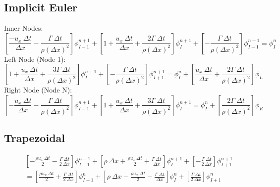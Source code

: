 \documentclass[12pt]{article}
\begin{document}
\subsection{Implicit Euler}
Inner Nodes:
\begin{equation}
    \left[ \frac{-u_x\: \Delta t}{\Delta x} - \frac{\Gamma\:\Delta t}{\rho\left(\Delta x\right)^2} \right]\phi_{I-1}^{n+1} + \left[ 1 + \frac{u_x\: \Delta t}{\Delta x} + \frac{2\Gamma\: \Delta t}{\rho\left(\Delta x\right)^2} \right]\phi_{I}^{n+1} + \left[ -\frac{\Gamma\: \Delta t}{\rho\left(\Delta x\right)^2} \right]\phi_{I+1}^{n+1} = \phi_{I}^{n}
    \label{eq:ie inner}
\end{equation}
Left Node (Node 1):
\begin{equation}
    \left[ 1 + \frac{u_x\:\Delta t}{\Delta x} + \frac{3\Gamma\:\Delta t}{\rho\left(\Delta x\right)^2} \right]\phi_{I}^{n+1} + \left[ -\frac{\Gamma\:\Delta t}{\rho\left(\Delta x\right)^2} \right]\phi_{I+1}^{n+1} = \phi_{I}^{n} + \left[ \frac{u_x\:\Delta t}{\Delta x} + \frac{2\Gamma\:\Delta t}{\rho\left(\Delta x\right)^2} \right]\phi_{L}
    \label{eq:ie left}
\end{equation}
Right Node (Node N):
\begin{equation}
    \left[ -\frac{u_x\:\Delta t}{\Delta x} - \frac{\Gamma\:\Delta t}{\rho\left(\Delta x\right)^2} \right]\phi_{I-1}^{n+1} + \left[ 1 + \frac{u_x\:\Delta t}{\Delta x} + \frac{3\Gamma\:\Delta t}{\rho\left(\Delta x\right)^2} \right]\phi_{I}^{n+1} = \phi_{I}^{n} + \left[ \frac{2\Gamma\:\Delta t}{\rho\left(\Delta x\right)^2} \right]\phi_{R}
    \label{eq:ie right}
\end{equation}


\subsection{Trapezoidal}
\begin{multline*}
    \left[ -\frac{\rho u_x\: \Delta t}{2} - \frac{\Gamma\: \Delta t}{2\: \Delta x} \right]\phi_{I-1}^{n+1} + \left[ \rho \:\Delta x + \frac{\rho u_x\: \Delta t}{2} + \frac{\Gamma\: \Delta t}{\Delta x} \right]\phi_{I}^{n+1} + \left[ -\frac{\Gamma\: \Delta t}{2\: \Delta x} \right]\phi_{I+1}^{n+1}\\
    = \left[ \frac{\rho u_x\: \Delta t}{2} + \frac{\Gamma\: \Delta t}{2\: \Delta x} \right]\phi_{I-1}^{n} + \left[ \rho \:\Delta x - \frac{\rho u_x\: \Delta t}{2} - \frac{\Gamma\: \Delta t}{\Delta x} \right]\phi_{I}^{n} + \left[ \frac{\Gamma\: \Delta t}{2\: \Delta x} \right]\phi_{I+1}^{n}
\end{multline*}
\end{document}
